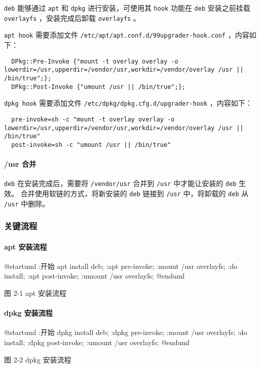 \documentclass{utart}
\begin{document}
\texttt{deb} 能够通过 \texttt{apt} 和 \texttt{dpkg} 进行安装，可使用其 \texttt{hook} 功能在 \texttt{deb} 安装之前挂载 \texttt{overlayfs} ，安装完成后卸载 \texttt{overlayfs} 。

\texttt{apt hook} 需要添加文件 \texttt{/etc/apt/apt.conf.d/99upgrader-hook.conf} ，内容如下：
\begin{verbatim}
  DPkg::Pre-Invoke {"mount -t overlay overlay -o lowerdir=/usr,upperdir=/vendor/usr,workdir=/vendor/overlay /usr || /bin/true";};
  DPkg::Post-Invoke {"umount /usr || /bin/true";};
\end{verbatim}

\texttt{dpkg hook} 需要添加文件 \texttt{/etc/dpkg/dpkg.cfg.d/upgrader-hook} ，内容如下：
\begin{verbatim}
  pre-invoke=sh -c "mount -t overlay overlay -o lowerdir=/usr,upperdir=/vendor/usr,workdir=/vendor/overlay /usr || /bin/true"
  post-invoke=sh -c "umount /usr || /bin/true"
\end{verbatim}

\paragraph{/usr 合并}
\texttt{deb} 在安装完成后，需要将 \texttt{/vendor/usr} 合并到 \texttt{/usr} 中才能让安装的 \texttt{deb} 生效。
合并使用软链的方式，将新安装的 \texttt{deb} 链接到 \texttt{/usr} 中，将卸载的 \texttt{deb} 从 \texttt{/usr} 中删除。

\subsubsection{关键流程}
\paragraph{apt 安装流程}
\begin{center}
  \begin{adjustbox}{scale=0.8}
    \begin{plantuml}
      @startuml
      :开始 apt install deb;
      :apt pre-invoke;
      :mount /usr overlayfs;
      :do install;
      :apt post-invoke;
      :umount /usr overlayfs;
      @enduml
    \end{plantuml}
  \end{adjustbox}

  图 2-1 apt 安装流程
\end{center}

\paragraph{dpkg 安装流程}
\begin{center}
  \begin{adjustbox}{scale=0.8}
    \begin{plantuml}
      @startuml
      :开始 dpkg install deb;
      :dpkg pre-invoke;
      :mount /usr overlayfs;
      :do install;
      :dpkg post-invoke;
      :umount /usr overlayfs;
      @enduml
    \end{plantuml}
  \end{adjustbox}

  图 2-2 dpkg 安装流程
\end{center}
\end{document}
